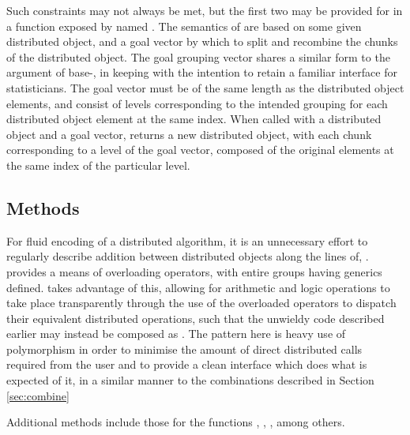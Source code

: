 Such constraints may not always be met, but the first two may be provided for in a function exposed by \lsr named .
The semantics of  are based on some given distributed object, and a goal vector by which to split and recombine the chunks of the distributed object.
The goal grouping vector shares a similar form to the  argument of base-\R {}, in keeping with the intention to retain a familiar \R interface for statisticians.
The goal vector must be of the same length as the distributed object elements, and consist of levels corresponding to the intended grouping for each distributed object element at the same index.
When called with a distributed object and a goal vector,  returns a new distributed object, with each chunk corresponding to a level of the goal vector, composed of the original elements at the same index of the particular level.

\subsection{Methods}

For fluid encoding of a distributed algorithm, it is an unnecessary effort to regularly describe addition between distributed objects along the lines of, .
\R provides a means of overloading operators, with entire groups having generics defined.
\lsr takes advantage of this, allowing for arithmetic and logic operations to take place transparently through the use of the overloaded operators to dispatch their equivalent distributed operations, such that the unwieldy code described earlier may instead be composed as .
The pattern here is heavy use of polymorphism in order to minimise the amount of direct distributed calls required from the user and to provide a clean interface which does what is expected of it, in a similar manner to the combinations described in Section \ref{sec:combine}

Additional methods include those for the functions , , , among others.


